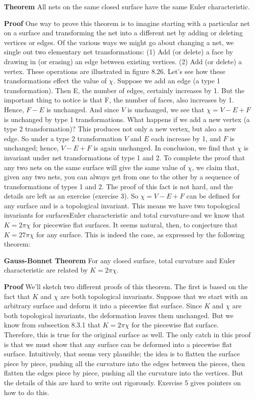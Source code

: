 \documentclass{book}
\begin{document}
\textbf{Theorem} All nets on the same closed surface have the same Euler characteristic.

\textbf{Proof} One way to prove this theorem is to imagine starting with a
particular net on a surface and transforming the net into a different net
by adding or deleting vertices or edges. Of the various ways we might go
about changing a net, we single out two elementary net transformations:
(1) Add (or delete) a face by drawing in (or erasing) an edge between
existing vertices. (2) Add (or delete) a vertex. These operations are
illustrated in figure 8.26. Let's see how these transformations effect the
value of $\chi$. Suppose we add an edge (a type 1 transformation). Then E,
the number of edges, certainly increases by 1. But the important thing to
notice is that F, the number of faces, also increases by 1. Hence, $F-E$
is unchanged. And since $V$ is unchanged, we see that $\chi = V - E + F$
is unchanged by type 1 transformations. What happens if we add a
new vertex (a type 2 transformation)? This produces not only a new
vertex, but also a new edge. So under a type 2 transformation $V$
and $E$ each increase by 1, and $F$ is unchanged; hence, $V - E + F$
is again unchanged. In conclusion, we find that $\chi$ is invariant under
net transformations of type 1 and 2. To complete the proof that any
two nets on the same surface will give the same value of $\chi$, we claim
that, given any two nets, you can always get from one to the other by a
sequence of transformations of types 1 and 2. The proof of this fact is
not hard, and the details are left as an exercise (exercise 3).
So $\chi = V - E + F$ can be defined for any surface and is a topological
invariant. This means we have two topological invariants for surfacesEuler characteristic and total curvature-and we know that $K = 2 \pi \chi $
for piecewise flat surfaces. It seems natural, then, to conjecture that
$ K = 27 \pi \chi $ for any surface. This is indeed the case, as expressed 
by the following theorem:

\noindent \textbf{Gauss-Bonnet Theorem} For any closed surface, total curvature and Euler
characteristic are related by $K = 2 \pi \chi $.

\noindent \textbf{Proof} We'll sketch two different proofs of this theorem. The first is based
on the fact that $K$ and $\chi$ are both topological invariants. Suppose that
we start with an arbitrary surface and deform it into a piecewise flat
surface. Since $K$ and $\chi$ are both topological invariants, the deformation
leaves them unchanged. But we know from subsection 8.3.1 that $K =
2 \pi \chi $ for the piecewise flat surface. Therefore, this is true for the original
surface as well. The only catch in this proof is that we must show that
any surface can be deformed into a piecewise flat surface. Intuitively,
that seems very plausible; the idea is to flatten the surface piece by piece,
pushing all the curvature into the edges between the pieces, then flatten
the edges piece by piece, pushing all the curvature into the vertices. But
the details of this are hard to write out rigorously. Exercise 5 gives
pointers on how to do this. 
\end{document}
